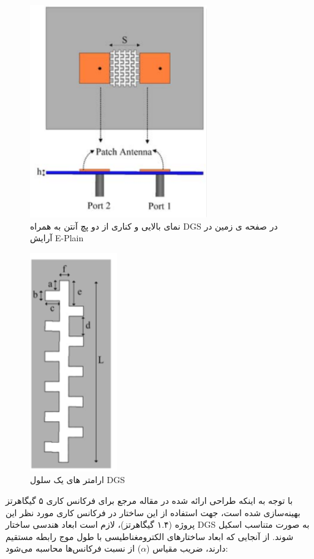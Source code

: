 \begin{figure}
	\centering
	\includegraphics[scale=0.5]{Images/fig27.png}
	\caption{نمای بالایی و کناری از دو پچ آنتن به همراه DGS در صفحه ی زمین در آرایش E-Plain}
	\label{fig27}
 \end{figure}

\begin{figure}
	\centering
	\includegraphics[scale=0.5]{Images/fig28.png}
	\caption{ارامتر های یک سلول DGS} %
	\label{fig28}
 \end{figure}
 
 
 با توجه به اینکه طراحی ارائه شده در مقاله مرجع
 \cite{carver1981microstrip}
 برای فرکانس کاری ۵ گیگاهرتز بهینه‌سازی شده است، جهت استفاده از این ساختار در فرکانس کاری مورد نظر این پروژه (۱.۴ گیگاهرتز)، لازم است ابعاد هندسی ساختار DGS به صورت متناسب اسکیل شوند. از آنجایی که ابعاد ساختارهای الکترومغناطیسی با طول موج رابطه مستقیم دارند، ضریب مقیاس ($\alpha$) از نسبت فرکانس‌ها محاسبه می‌شود: 
 
